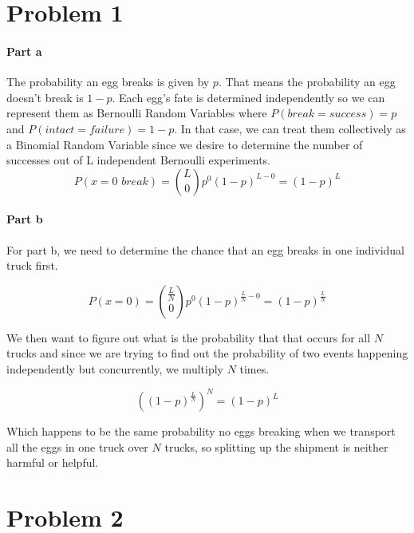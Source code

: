 \documentclass[12pt]{article}
\begin{document}
\maketitle

\section{Problem 1}

\paragraph{Part a} The probability an egg breaks is given by $p$.
That means the probability an egg doesn't break is $1-p$.
Each egg's fate is determined independently so we can represent them as Bernoulli Random Variables where $P(break = success) = p$ and $P(intact = failure) = 1 - p$.
In that case, we can treat them collectively as a Binomial Random Variable since we desire to determine the number of successes out of L independent Bernoulli experiments.
$$P(x = 0\,\,break) = {L \choose 0}p^0(1-p)^{L-0} = (1-p)^L$$

\paragraph{Part b} For part b, we need to determine the chance that an egg breaks in one individual truck first.

$$P(x = 0) = {\frac{L}{N} \choose 0}p^0(1-p)^{\frac{L}{N}-0} = (1-p)^{\frac{L}{N}}$$

We then want to figure out what is the probability that that occurs for all $N$ trucks and since we are trying to find out the probability of two events happening independently but concurrently, we multiply $N$ times.

$$((1-p)^{\frac{L}{N}})^N = (1-p)^L$$

Which happens to be the same probability no eggs breaking when we transport all the eggs in one truck over $N$ trucks, so splitting up the shipment is neither harmful or helpful.

\section{Problem 2}
\end{document}
